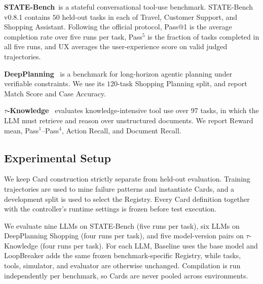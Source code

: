 \documentclass[letterpaper]{article}
\begin{document}
\textbf{STATE-Bench}~is a stateful conversational tool-use benchmark. STATE-Bench v0.8.1 contains $50$ held-out tasks in each of Travel, Customer Support, and Shopping Assistant. Following the official protocol, Pass@1 is the average completion rate over five runs per task, Pass$^5$ is the fraction of tasks completed in all five runs, and UX averages the user-experience score on valid judged trajectories.

\textbf{DeepPlanning}~\citep{zhang2026deepplanning} is a benchmark for long-horizon agentic planning under verifiable constraints. We use its $120$-task Shopping Planning split, and report Match Score and Case Accuracy.

\textbf{$\tau$-Knowledge}~\citep{shi2026tauknowledge} evaluates knowledge-intensive tool use over $97$ tasks, in which the LLM must retrieve and reason over unstructured documents. We report Reward mean, Pass$^1$--Pass$^4$, Action Recall, and Document Recall.

\subsection*{Experimental Setup}

We keep Card construction strictly separate from held-out evaluation. Training trajectories are used to mine failure patterns and instantiate Cards, and a development split is used to select the Registry. Every Card definition together with the controller's runtime settings is frozen before test execution.

We evaluate nine LLMs on STATE-Bench (five runs per task), six LLMs on DeepPlanning Shopping (four runs per task), and five model-version pairs on $\tau$-Knowledge (four runs per task). For each LLM, Baseline uses the base model and LoopBreaker adds the same frozen benchmark-specific Registry, while tasks, tools, simulator, and evaluator are otherwise unchanged. Compilation is run independently per benchmark, so Cards are never pooled across environments.
\end{document}
